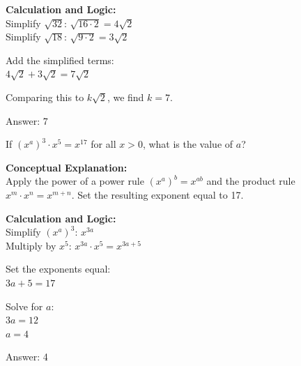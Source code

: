 \documentclass[11pt,paper=a4,answers]{exam}
\begin{document}
\begin{questions}
\begin{solution}
\vspace{20pt}

\textbf{Calculation and Logic:} \\
Simplify $\sqrt{32}$: $\sqrt{16 \cdot 2} = 4\sqrt{2}$ \\
Simplify $\sqrt{18}$: $\sqrt{9 \cdot 2} = 3\sqrt{2}$

\vspace{10pt}

Add the simplified terms: \\
$4\sqrt{2} + 3\sqrt{2} = 7\sqrt{2}$

\vspace{10pt}

Comparing this to $k\sqrt{2}$, we find $k = 7$.

\vspace{25pt}

Answer: \colorbox{yellow!100}{7}
\end{solution}

\vspace{40pt}

\question
If $(x^a)^3 \cdot x^5 = x^{17}$ for all $x > 0$, what is the value of $a$?

\begin{solution}
\textbf{Conceptual Explanation:} \\
Apply the power of a power rule $(x^a)^b = x^{ab}$ and the product rule $x^m \cdot x^n = x^{m+n}$. Set the resulting exponent equal to 17.

\vspace{20pt}

\textbf{Calculation and Logic:} \\
Simplify $(x^a)^3$: $x^{3a}$ \\
Multiply by $x^5$: $x^{3a} \cdot x^5 = x^{3a+5}$

\vspace{10pt}

Set the exponents equal: \\
$3a + 5 = 17$

\vspace{10pt}

Solve for $a$: \\
$3a = 12$ \\
$a = 4$

\vspace{25pt}

Answer: \colorbox{yellow!100}{4}
\end{solution}


\end{questions}
\end{document}
